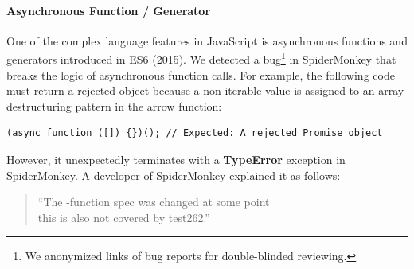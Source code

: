 
\paragraph{\textbf{Asynchronous Function / Generator}}
One of the complex language features in JavaScript is asynchronous functions and
generators introduced in ES6 (2015).
%
We detected a bug\footnote{
  We anonymized links of bug reports for double-blinded reviewing.
} in SpiderMonkey that breaks the logic of asynchronous function calls.
%
For example, the following code must return a rejected  object
because a non-iterable value  is assigned to an array
destructuring pattern \jscode{[]} in the  arrow function:
%
\begin{lstlisting}[style=JS, basicstyle=\footnotesize\ttfamily]
    (async function ([]) {})(); // Expected: A rejected Promise object
\end{lstlisting}
However, it unexpectedly terminates with a \textbf{TypeError} exception in SpiderMonkey.
A developer of SpiderMonkey explained it as follows:
\begin{quote}
``The -function spec was changed at some point \textelp{}\\
this is also not covered by test262.''
\end{quote}
%


